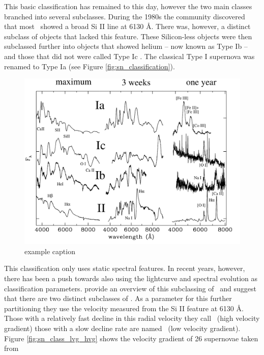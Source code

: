 This basic classification has remained to this day, however the two main classes branched into several subclasses.
During the 1980s the community discovered that most \sneia\ showed a broad Si II line at 6130 \AA. There was, however, a distinct subclass of objects that lacked this feature. These Silicon-less objects were then subclassed further into objects that showed helium -- now known as Type Ib --  and those that did not were called Type Ic \citep{1987ApJ...317..355H, 1986ApJ...306L..77G}. The classical Type I supernova was renamed to Type Ia (see Figure \ref{fig:sn_classification}). 

\begin{figure}[htbp] %
   \centering
   \includegraphics[width=\textwidth]{chapter_intro/plots/sn_class_spectra.pdf} 
   \caption{example caption}
   \label{fig:sn_class_spectra}
\end{figure}

This classification only uses static spectral features. In recent years, however, there has been a push towards also using the lightcurve and spectral evolution as classification parameters. \citet{2005ApJ...623.1011B} provide an overview of this subclassing of \sneia\ and suggest that there are two distinct subclasses of \sneia. As a parameter for this further partitioning they use the velocity measured from the Si II feature at 6130 \AA. Those with a relatively fast decline in this radial velocity they call \hvg\ (high velocity gradient) those with a slow decline rate are named \lvg\ (low velocity gradient). 
Figure \ref{fig:sn_class_lvg_hvg} shows the velocity gradient of 26 supernovae taken from  \citet{2005ApJ...623.1011B}

